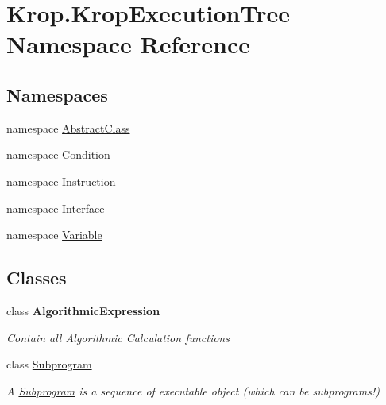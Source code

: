 \hypertarget{namespace_krop_1_1_krop_execution_tree}{}\section{Krop.\+Krop\+Execution\+Tree Namespace Reference}
\label{namespace_krop_1_1_krop_execution_tree}
\subsection*{Namespaces}
\begin{DoxyCompactItemize}
\item 
namespace \mbox{\hyperlink{namespace_krop_1_1_krop_execution_tree_1_1_abstract_class}{Abstract\+Class}}
\item 
namespace \mbox{\hyperlink{namespace_krop_1_1_krop_execution_tree_1_1_condition}{Condition}}
\item 
namespace \mbox{\hyperlink{namespace_krop_1_1_krop_execution_tree_1_1_instruction}{Instruction}}
\item 
namespace \mbox{\hyperlink{namespace_krop_1_1_krop_execution_tree_1_1_interface}{Interface}}
\item 
namespace \mbox{\hyperlink{namespace_krop_1_1_krop_execution_tree_1_1_variable}{Variable}}
\end{DoxyCompactItemize}
\subsection*{Classes}
\begin{DoxyCompactItemize}
\item 
class {\bfseries Algorithmic\+Expression}
\begin{DoxyCompactList}\small\item\em Contain all Algorithmic Calculation functions \end{DoxyCompactList}\item 
class \mbox{\hyperlink{class_krop_1_1_krop_execution_tree_1_1_subprogram}{Subprogram}}
\begin{DoxyCompactList}\small\item\em A \mbox{\hyperlink{class_krop_1_1_krop_execution_tree_1_1_subprogram}{Subprogram}} is a sequence of executable object (which can be subprograms!) \end{DoxyCompactList}\end{DoxyCompactItemize}
